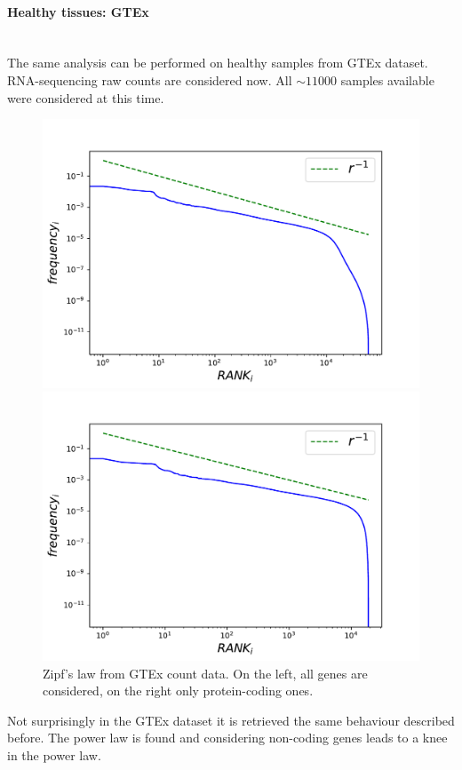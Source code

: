 \paragraph{Healthy tissues: GTEx}\mbox{} \\
The same analysis can be performed on healthy samples from GTEx dataset. RNA-sequencing raw counts are considered now. All $\sim11000$ samples available were considered at this time.
\begin{figure}[htb!]
    \centering
    \begin{minipage}{0.45\textwidth}
    \includegraphics[width=0.95\linewidth]{pictures/structure/gtex/globalZipf.pdf}
    \end{minipage}
    \hspace{2mm}
    \begin{minipage}{0.45\textwidth}
    \includegraphics[width=0.95\linewidth]{pictures/structure/gtex/globalZipf_c.pdf}
    \end{minipage}
    \caption{Zipf's law from GTEx count data. On the left, all genes are considered, on the right only protein-coding ones.}
    \label{fig:my_label}
\end{figure}
Not surprisingly in the GTEx dataset it is retrieved the same behaviour described before. The power law is found and considering non-coding genes leads to a knee in the power law.

